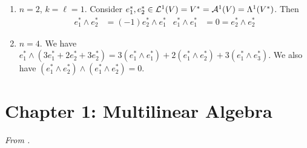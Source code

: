 \documentclass[../notes.tex]{subfiles}
\begin{document}
\begin{itemize}
\begin{enumerate}
        \item $n=2$, $k=\ell=1$. Consider $e_1^*,e_2^*\in\lin[1]{V}=V^*=\alt[1]{V}=\lam[1]{V^*}$. Then
        \begin{align*}
            e_1^*\wedge e_2^* &= (-1)e_2^*\wedge e_1^*&
            e_1^*\wedge e_1^* &= 0 = e_2^*\wedge e_2^*
        \end{align*}
        \item $n=4$. We have $e_1^*\wedge(3e_1^*+2e_2^*+3e_2^*)=3(e_1^*\wedge e_1^*)+2(e_1^*\wedge e_2^*)+3(e_1^*\wedge e_3^*)$. We also have $(e_1^*\wedge e_2^*)\wedge(e_1^*\wedge e_2^*)=0$.
    \end{enumerate}
\end{itemize}



\section{Chapter 1: Multilinear Algebra}
\emph{From \textcite{bib:DifferentialForms}.}
\end{document}
